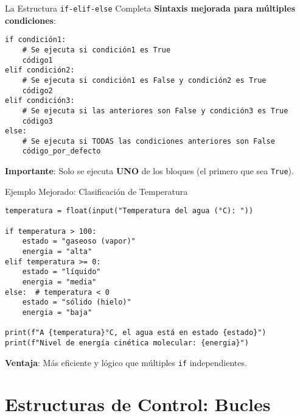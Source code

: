 \documentclass[10pt]{beamer}
\begin{document}
\begin{frame}[fragile]{La Estructura \texttt{if-elif-else} Completa}
  \textbf{Sintaxis mejorada para múltiples condiciones}:
  \begin{verbatim}
if condición1:
    # Se ejecuta si condición1 es True
    código1
elif condición2:
    # Se ejecuta si condición1 es False y condición2 es True
    código2
elif condición3:
    # Se ejecuta si las anteriores son False y condición3 es True
    código3
else:
    # Se ejecuta si TODAS las condiciones anteriores son False
    código_por_defecto
  \end{verbatim}
  
  \textbf{Importante}: Solo se ejecuta \textbf{UNO} de los bloques (el primero que sea \texttt{True}).
\end{frame}


\begin{frame}[fragile]{Ejemplo Mejorado: Clasificación de Temperatura}
\begin{verbatim}
temperatura = float(input("Temperatura del agua (°C): "))

if temperatura > 100:
    estado = "gaseoso (vapor)"
    energia = "alta"
elif temperatura >= 0:
    estado = "líquido"
    energia = "media"
else:  # temperatura < 0
    estado = "sólido (hielo)"
    energia = "baja"

print(f"A {temperatura}°C, el agua está en estado {estado}")
print(f"Nivel de energía cinética molecular: {energia}")
\end{verbatim}

\textbf{Ventaja}: Más eficiente y lógico que múltiples \texttt{if} independientes.
\end{frame}

\section{Estructuras de Control: Bucles}
\end{document}
